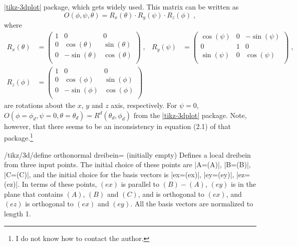 \documentclass[a4paper,fleqn]{ltxdoc}
\begin{document}
\href{https://ctan.org/pkg/tikz-3dplot?lang=en}{|tikz-3dplot|} package, which
gets widely used. This matrix can be written as 
\[O(\phi,\psi,\theta)=R_x(\theta)\cdot R_y(\psi)\cdot R_z(\phi)\;,\]
where 
\begin{align*}
 R_x(\theta)&=
 \begin{pmatrix}
  1 & 0 & 0 \\
  0 & \cos (\theta ) & \sin (\theta ) \\
  0 & -\sin (\theta ) & \cos (\theta ) \\
 \end{pmatrix}\;,&
 R_y(\psi)&=
 \begin{pmatrix}
  \cos (\psi ) & 0 & -\sin (\psi ) \\
  0 & 1 & 0 \\
  \sin (\psi ) & 0 & \cos (\psi ) \\
 \end{pmatrix}\;,\\
 R_z(\phi)&=
 \begin{pmatrix}
  1 & 0 & 0 \\
  0 & \cos (\phi ) & \sin (\phi ) \\
  0 & -\sin (\phi ) & \cos (\phi ) \\
 \end{pmatrix}
\end{align*}
are rotations about the $x$, $y$ and $z$ axis, respectively.  For $\psi=0$,
$O(\phi=\phi_d,\psi=0,\theta=\theta_d)=R^d(\theta_d,\phi_d)$ from the
\href{https://ctan.org/pkg/tikz-3dplot?lang=en}{|tikz-3dplot|} package. Note,
however, that there seems to be an inconsistency in equation (2.1) of that
package.\footnote{I do not know how to contact the author.}

\begin{codeexample}[width=2.5cm]
\end{codeexample}

\begin{key}{/tikz/3d/define orthonormal dreibein= (initially empty)}
		Defines a local dreibein from three input points. The initial choice of
		these points are |A=(A)|, |B=(B)|, |C=(C)|, and the initial choice for
		the basis vectors is |ex=(ex)|, |ey=(ey)|, |ez=(ez)|. In terms of these
		points, $(ex)$ is parallel to $(B)-(A)$, $(ey)$ is in the plane that
		contains $(A)$, $(B)$ and $(C)$, and is orthogonal to $(ex)$, and $(ez)$
		is orthogonal to $(ex)$ and $(ey)$. All the basis vectors are normalized
		to length 1.
\end{key}
\end{document}
